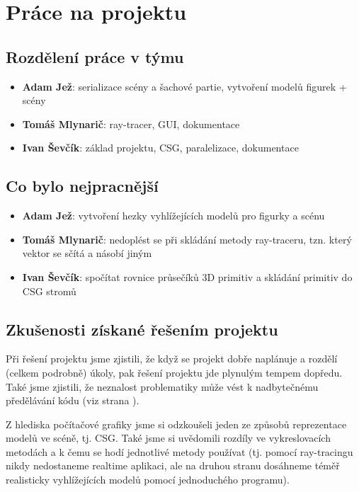 \documentclass[12pt,a4paper,titlepage,final]{report}
\newcommand\AuthorA{Adam Jež}
\newcommand\AuthorB{Tomáš Mlynarič}
\newcommand\AuthorC{Ivan Ševčík}
\begin{document}
\chapter{Práce na projektu}

\section{Rozdělení práce v týmu}

\begin{itemize}
\item \textbf{\AuthorA}: serializace scény a šachové partie, vytvoření modelů figurek + scény 
\item \textbf{\AuthorB}: ray-tracer, GUI, dokumentace
\item \textbf{\AuthorC}: základ projektu, CSG, paralelizace,  dokumentace
\end{itemize}

\section{Co bylo nejpracnější}

\begin{itemize}
\item \textbf{\AuthorA}: vytvoření hezky vyhlížejících modelů pro figurky a scénu
\item \textbf{\AuthorB}: nedoplést se při skládání metody ray-traceru, tzn. který vektor se sčítá a násobí jiným
\item \textbf{\AuthorC}: spočítat rovnice průsečíků 3D primitiv a skládání primitiv do CSG stromů
\end{itemize}


\section{Zkušenosti získané řešením projektu}

Při řešení projektu jsme zjistili, že když se projekt dobře naplánuje a rozdělí (celkem podrobně) úkoly, pak řešení projektu jde plynulým tempem dopředu. Také jsme zjistili, že neznalost problematiky může vést k nadbytečnému předělávání kódu (viz strana \pageref{sec:fps}).

Z hlediska počítačové grafiky jsme si odzkoušeli jeden ze způsobů reprezentace modelů ve scéně, tj. CSG. Také jsme si uvědomili rozdíly ve vykreslovacích metodách a k čemu se hodí jednotlivé metody používat (tj. pomocí ray-tracingu nikdy nedostaneme realtime aplikaci, ale na druhou stranu dosáhneme téměř realisticky vyhlížejících modelů pomocí jednoduchého programu). 
\end{document}
